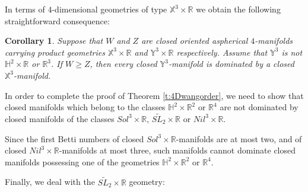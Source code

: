 \documentclass[12pt]{amsart}
\newtheorem{cor}[thm]{Corollary}
\theoremstyle{remark}
\begin{document}
In terms of $4$-dimensional geometries of type $\mathbb{X}^3 \times {\mathbb{R}}$ we obtain the following straightforward consequence:

\begin{cor}
 Suppose that $W$ and $Z$ are closed oriented aspherical $4$-manifolds carrying product geometries $\mathbb{X}^3 \times {\mathbb{R}}$ and $\mathbb{Y}^3 \times {\mathbb{R}}$ respectively. Assume that $\mathbb{Y}^3$ is not $\mathbb{H}^2 \times {\mathbb{R}}$ or ${\mathbb{R}}^3$. If $W \geq Z$, then every closed $\mathbb{Y}^3$-manifold is dominated by a closed $\mathbb{X}^3$-manifold.
\end{cor}

In order to complete the proof of Theorem \ref{t:4Dwangorder}, we need to show that closed manifolds which belong to the classes $\mathbb{H}^2 \times {\mathbb{R}}^2$ or ${\mathbb{R}}^4$
are not dominated by closed manifolds of the classes $Sol^3 \times {\mathbb{R}}$, $\widetilde{SL_2} \times {\mathbb{R}}$ or $Nil^3 \times {\mathbb{R}}$.

Since the first Betti numbers of closed $Sol^3 \times {\mathbb{R}}$-manifolds are at most two, and of closed $Nil^3 \times {\mathbb{R}}$-manifolds at most three, such manifolds cannot dominate closed manifolds possessing one of the geometries $\mathbb{H}^2 \times {\mathbb{R}}^2$ or ${\mathbb{R}}^4$.

Finally, we deal with the $\widetilde{SL_2} \times {\mathbb{R}}$ geometry:
\end{document}
